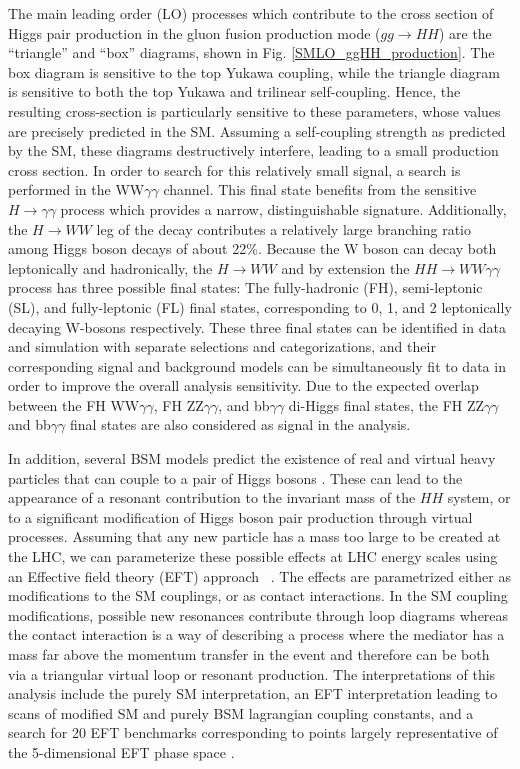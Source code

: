 The main leading order (LO) processes which contribute to the cross section of Higgs pair production in the gluon fusion production mode ($gg \to HH$) are the ``triangle'' and ``box'' diagrams, shown in Fig. \ref{SMLO_ggHH_production}. 
The box diagram is sensitive to the top Yukawa coupling, while the triangle diagram is sensitive to both the top Yukawa and trilinear self-coupling. 
Hence, the resulting cross-section is particularly sensitive to these parameters, whose values are precisely predicted in the SM. Assuming a self-coupling strength as predicted
by the SM, these diagrams destructively 
interfere, leading to a small production cross section. In order to search for this relatively small signal, a search is performed in the WW$\gamma\gamma$ channel. 
This final state benefits from the sensitive $H\rightarrow\gamma\gamma$ process which provides a narrow, distinguishable signature. Additionally, the
$H\rightarrow WW$ leg of the decay contributes a relatively large branching ratio among Higgs boson decays of about 22\%. 
Because the W boson can decay both leptonically and hadronically, the $H\rightarrow WW$ and by extension the $HH\rightarrow WW\gamma\gamma$ process has three possible final states:
The fully-hadronic (FH), semi-leptonic (SL), and fully-leptonic (FL) final states, corresponding to 0, 1, and 2 leptonically decaying W-bosons respectively. These three final states can be identified in data and simulation
with separate selections and categorizations, and their corresponding
signal and background models can be simultaneously fit to data in order to improve the overall analysis sensitivity. Due to the expected overlap between the FH WW$\gamma\gamma$, FH ZZ$\gamma\gamma$, and bb$\gamma\gamma$ di-Higgs
final states, the FH ZZ$\gamma\gamma$ and bb$\gamma\gamma$ final states are also considered as signal in the analysis.

In addition, several BSM models predict the existence of real and virtual heavy particles that can couple to a pair of Higgs bosons \cite{deFlorian:2016spz, Nakamura:2017irk, Englert:2019eyl, Robens:2019kga, Tang:2012pv}.
These can lead to the appearance of a resonant contribution to the invariant mass of the $HH$ system, or to a significant modification of Higgs boson pair production through virtual processes. Assuming that any new particle has a 
mass too large to be created at the LHC, we can parameterize 
these possible effects at LHC energy scales using an Effective field theory (EFT) approach ~\cite{deFlorian:2016spz, Carvalho:2015ttv}. The effects are parametrized either as modifications to the SM couplings, 
or as contact interactions. In the SM coupling modifications, possible new resonances contribute through loop diagrams whereas the contact interaction is a way of 
describing a process where the mediator has a mass far above the momentum transfer in the event and therefore can be both via a triangular virtual loop or resonant production. 
The interpretations of this analysis include the purely SM interpretation, an EFT interpretation leading to scans of modified SM and purely BSM lagrangian coupling constants, 
and a search for 20 EFT benchmarks corresponding to points largely representative of the 5-dimensional EFT phase space \cite{Carvalho:2015ttv,Buchalla:2018yce,Capozi:2019xsi}.  

